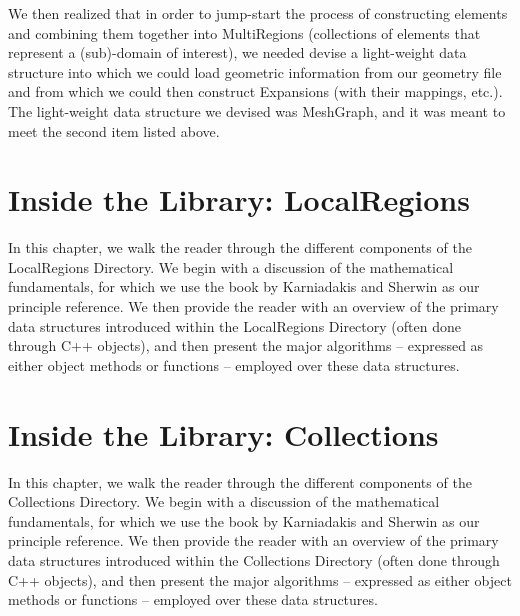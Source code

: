 We then realized that in order to jump-start the process of
constructing elements and combining them together into MultiRegions
(collections of elements that represent a (sub)-domain of interest),
we needed devise a light-weight data structure into which we could
load geometric information from our geometry file and from which we
could then construct Expansions (with their mappings, etc.).  The
light-weight data structure we devised was MeshGraph, and it was meant
to meet the second item listed above.



%

%



\chapter{Inside the Library: LocalRegions}
\label{chap:localregions}


In this chapter, we walk the reader through the different components
of the LocalRegions Directory.  We begin with a discussion of the
mathematical fundamentals, for which we use the book by Karniadakis
and Sherwin \cite{KaSh05} as our principle reference.  We then provide
the reader with an overview of the primary data structures introduced
within the LocalRegions Directory (often done through C++ objects),
and then present the major algorithms -- expressed as either object
methods or functions -- employed over these data structures.


%

%



\chapter{Inside the Library: Collections}

In this chapter, we walk the reader through the different components
of the Collections Directory.  We begin with a discussion of the
mathematical fundamentals, for which we use the book by Karniadakis
and Sherwin \cite{KaSh05} as our principle reference.  We then provide
the reader with an overview of the primary data structures introduced
within the Collections Directory (often done through C++ objects), and
then present the major algorithms -- expressed as either object
methods or functions -- employed over these data structures.

